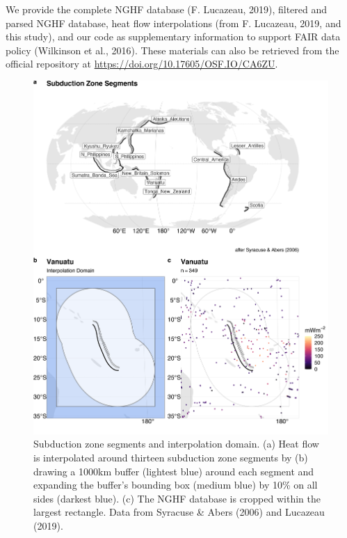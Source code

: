 \documentclass[draft,linenumbers]{agujournal2018}
\begin{document}
We provide the complete NGHF database (F. Lucazeau, 2019), filtered and
parsed NGHF database, heat flow interpolations (from F. Lucazeau, 2019,
and this study), and our code as supplementary information to support
FAIR data policy (Wilkinson et al., 2016). These materials can also be
retrieved from the official repository at
\url{https://doi.org/10.17605/OSF.IO/CA6ZU}.

\begin{figure}[h]

{\centering \includegraphics[width=0.95\linewidth,]{../figs/base/segs_comp} 

}

\caption{Subduction zone segments and interpolation domain. (a) Heat flow is interpolated around thirteen subduction zone segments by (b) drawing a 1000km buffer (lightest blue) around each segment and expanding the buffer's bounding box (medium blue) by 10\% on all sides (darkest blue). (c) The NGHF database is cropped within the largest rectangle. Data from Syracuse \& Abers (2006) and Lucazeau (2019).}\label{fig:segments}
\end{figure}

\clearpage
\end{document}
